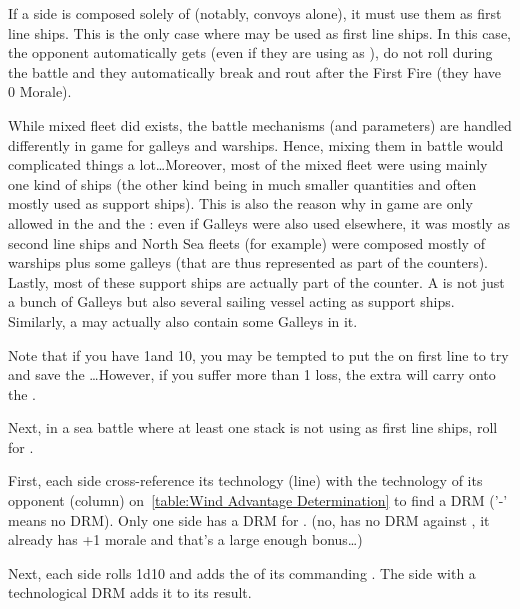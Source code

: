 If a side is composed solely of \NTD (notably, convoys alone), it must use
them as first line ships. This is the only case where \NTD may be used as
first line ships. In this case, the opponent automatically gets  (even if they are using \NGD as ), \NTD
do not roll during the battle and they automatically break and rout after the
First Fire (they have 0 Morale).

\begin{designnote}
  While mixed fleet did exists, the battle mechanisms (and parameters) are
  handled differently in game for galleys and warships. Hence, mixing them in
  battle would complicated things a lot\ldots Moreover, most of the mixed
  fleet were using mainly one kind of ships (the other kind being in much
  smaller quantities and often mostly used as support ships). This is also the
  reason why in game \NGD are only allowed in the  and
  the : even if Galleys were also used elsewhere, it was
  mostly as second line ships and North Sea fleets (for example) were composed
  mostly of warships plus some galleys (that are thus represented as part of
  the counters). Lastly, most of these support ships are actually part of the
  counter. A \NGD is not just a bunch of Galleys but also several sailing
  vessel acting as support ships. Similarly, a \NWD may actually also contain
  some Galleys in it.

  \smallskip

  Note that if you have 1\NWD and 10\NGD, you may be tempted to put the \NWD
  on first line to try and save the \NGD\ldots However, if you suffer more
  than 1 loss, the extra will carry onto the \NGD.
\end{designnote}

Next, in a sea battle where at least one stack is not using \NGD as first line
ships, roll for .


First, each side cross-reference its technology (line) with the technology of
its opponent (column) on~\ref{table:Wind Advantage Determination} to find a
DRM ('-' means no DRM). Only one side has a DRM for .
(no, \TBAT has no DRM against \TGF, it already has +1 morale and that's a
large enough bonus\ldots)

Next, each side rolls 1d10 and adds the \Man of its commanding \LeaderA. The
side with a technological DRM adds it to its result.

